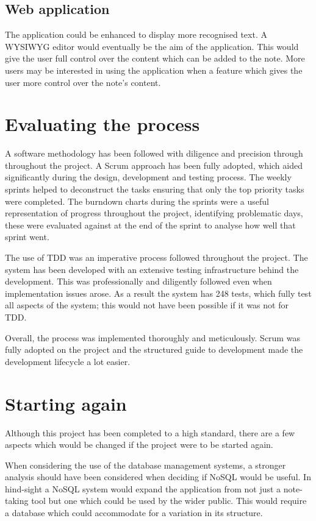 \subsection{Web application}
The application could be enhanced to display more recognised text. A WYSIWYG editor would eventually be the aim of the application. This would give the user full control over the content which can be added to the note. More users may be interested in using the application when a feature which gives the user more control over the note's content.

\section{Evaluating the process}
A software methodology has been followed with diligence and precision through throughout the project. A Scrum approach has been fully adopted,  which aided significantly during the design, development and testing process. The weekly sprints helped to deconstruct the tasks ensuring that only the top priority tasks were completed. The burndown charts during the sprints were a useful representation of progress throughout the project, identifying problematic days, these were evaluated against at the end of the sprint to analyse how well that sprint went.

The use of TDD was an imperative process followed throughout the project. The system has been developed with an extensive testing infrastructure behind the development. This was professionally and diligently followed even when implementation issues arose. As a result the system has 248 tests, which fully test all aspects of the system; this would not have been possible if it was not for TDD.

Overall, the process was implemented thoroughly and meticulously. Scrum was fully adopted on the project and the structured guide to development made the development lifecycle a lot easier.

\section{Starting again}
Although this project has been completed to a high standard, there are a few aspects which would be changed if the project were to be started again.

When considering the use of the database management systems, a stronger analysis should have been considered when deciding if NoSQL would be useful. In hind-sight a NoSQL system would expand the application from not just a note-taking tool but one which could be used by the wider public. This would require a database which could accommodate for a variation in its structure.


